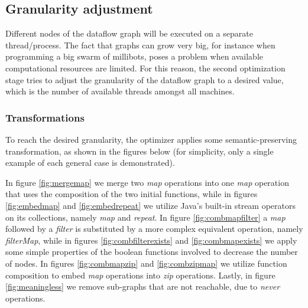 \documentclass[sigplan,review,anonymous]{acmart}
\begin{document}

\subsection{Granularity adjustment}

Different nodes of the dataflow graph will be executed on a separate
thread/process. The fact that graphs can grow very big, for instance when
programming a big swarm of millibots\cite{army}, poses a problem when available
computational resources are limited. For this reason, the second optimization
stage tries to adjust the granularity of the dataflow graph to a desired value,
which is the number of available threads amongst all machines.

\subsubsection{Transformations}

To reach the desired granularity, the optimizer applies some semantic-preserving
transformation, as shown in the figures below (for simplicity, only a single
example of each general case is demonstrated).


In figure \ref{fig:mergemap} we merge two \textit{map} operations into
one \textit{map} operation that uses the composition of the two initial
functions, while in figures \ref{fig:embedmap} and \ref{fig:embedrepeat} we
utilize Java's built-in stream operators on its collections, namely \textit{map}
and \textit{repeat}. In figure \ref{fig:combmapfilter} a \textit{map} followed
by a \textit{filter} is substituted by a more complex equivalent operation,
namely \textit{filterMap}, while in figures \ref{fig:combfilterexists} and
\ref{fig:combmapexists} we apply some simple properties of the boolean functions
involved to decrease the number of nodes. In figures \ref{fig:combmapzip} and
\ref{fig:combzipmap} we utilize function composition to embed \textit{map}
operations into \textit{zip} operations. Lastly, in figure \ref{fig:meaningless}
we remove sub-graphs that are not reachable, due to \textit{never} operations.
\end{document}
